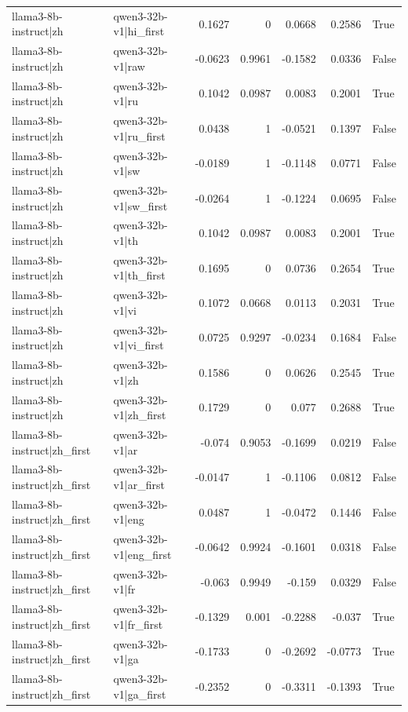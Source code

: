 \begin{table}
\begin{tabular}{l l r r r r l}
llama3-8b-instruct|zh & qwen3-32b-v1|hi_first & 0.1627 & 0 & 0.0668 & 0.2586 & True \\
llama3-8b-instruct|zh & qwen3-32b-v1|raw & -0.0623 & 0.9961 & -0.1582 & 0.0336 & False \\
llama3-8b-instruct|zh & qwen3-32b-v1|ru & 0.1042 & 0.0987 & 0.0083 & 0.2001 & True \\
llama3-8b-instruct|zh & qwen3-32b-v1|ru_first & 0.0438 & 1 & -0.0521 & 0.1397 & False \\
llama3-8b-instruct|zh & qwen3-32b-v1|sw & -0.0189 & 1 & -0.1148 & 0.0771 & False \\
llama3-8b-instruct|zh & qwen3-32b-v1|sw_first & -0.0264 & 1 & -0.1224 & 0.0695 & False \\
llama3-8b-instruct|zh & qwen3-32b-v1|th & 0.1042 & 0.0987 & 0.0083 & 0.2001 & True \\
llama3-8b-instruct|zh & qwen3-32b-v1|th_first & 0.1695 & 0 & 0.0736 & 0.2654 & True \\
llama3-8b-instruct|zh & qwen3-32b-v1|vi & 0.1072 & 0.0668 & 0.0113 & 0.2031 & True \\
llama3-8b-instruct|zh & qwen3-32b-v1|vi_first & 0.0725 & 0.9297 & -0.0234 & 0.1684 & False \\
llama3-8b-instruct|zh & qwen3-32b-v1|zh & 0.1586 & 0 & 0.0626 & 0.2545 & True \\
llama3-8b-instruct|zh & qwen3-32b-v1|zh_first & 0.1729 & 0 & 0.077 & 0.2688 & True \\
llama3-8b-instruct|zh_first & qwen3-32b-v1|ar & -0.074 & 0.9053 & -0.1699 & 0.0219 & False \\
llama3-8b-instruct|zh_first & qwen3-32b-v1|ar_first & -0.0147 & 1 & -0.1106 & 0.0812 & False \\
llama3-8b-instruct|zh_first & qwen3-32b-v1|eng & 0.0487 & 1 & -0.0472 & 0.1446 & False \\
llama3-8b-instruct|zh_first & qwen3-32b-v1|eng_first & -0.0642 & 0.9924 & -0.1601 & 0.0318 & False \\
llama3-8b-instruct|zh_first & qwen3-32b-v1|fr & -0.063 & 0.9949 & -0.159 & 0.0329 & False \\
llama3-8b-instruct|zh_first & qwen3-32b-v1|fr_first & -0.1329 & 0.001 & -0.2288 & -0.037 & True \\
llama3-8b-instruct|zh_first & qwen3-32b-v1|ga & -0.1733 & 0 & -0.2692 & -0.0773 & True \\
llama3-8b-instruct|zh_first & qwen3-32b-v1|ga_first & -0.2352 & 0 & -0.3311 & -0.1393 & True \\

\end{tabular}
\end{table}
